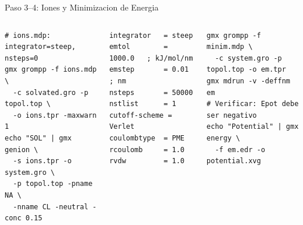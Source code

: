 \documentclass[aspectratio=169, 10pt]{beamer}
\begin{document}
\begin{frame}[fragile,shrink=2]{Paso 3--4: Iones y Minimizacion de Energia}
\begin{columns}[T]
\begin{tcolorbox}[definitionbox, title={3. Anadir iones (neutralizar)}]
\begin{lstlisting}[style=bashstyle]
# ions.mdp: integrator=steep, nsteps=0
gmx grompp -f ions.mdp \
  -c solvated.gro -p topol.top \
  -o ions.tpr -maxwarn 1
echo "SOL" | gmx genion \
  -s ions.tpr -o system.gro \
  -p topol.top -pname NA \
  -nname CL -neutral -conc 0.15
\end{lstlisting}
\end{tcolorbox}
\column{0.47\textwidth}
\begin{tcolorbox}[warningbox, title={4. minim.mdp (puntos clave)}]
\begin{lstlisting}[style=mdpstyle]
integrator   = steep
emtol        = 1000.0   ; kJ/mol/nm
emstep       = 0.01     ; nm
nsteps       = 50000
nstlist      = 1
cutoff-scheme = Verlet
coulombtype  = PME
rcoulomb     = 1.0
rvdw         = 1.0
\end{lstlisting}
\end{tcolorbox}
\begin{tcolorbox}[definitionbox, title={Ejecutar EM}]
\begin{lstlisting}[style=bashstyle]
gmx grompp -f minim.mdp \
  -c system.gro -p topol.top -o em.tpr
gmx mdrun -v -deffnm em
# Verificar: Epot debe ser negativo
echo "Potential" | gmx energy \
  -f em.edr -o potential.xvg
\end{lstlisting}
\end{tcolorbox}
\end{columns}
\end{frame}
\end{document}
